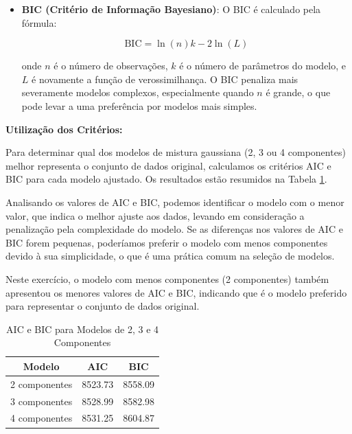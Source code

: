 \begin{enumerate}
\begin{tcolorbox}[colback=white, colframe=black, title=Resposta:]
\begin{itemize}
        \item \textbf{BIC (Critério de Informação Bayesiano)}: O BIC é calculado pela fórmula:
    
        \[
        \text{BIC} = \ln(n)k - 2\ln(L)
        \]
    
        onde \(n\) é o número de observações, \(k\) é o número de parâmetros do modelo, e \(L\) é novamente a função de verossimilhança. O BIC penaliza mais severamente modelos complexos, especialmente quando \(n\) é grande, o que pode levar a uma preferência por modelos mais simples.
    
    \end{itemize}
    
    \textbf{Utilização dos Critérios:} 
    
    Para determinar qual dos modelos de mistura gaussiana (2, 3 ou 4 componentes) melhor representa o conjunto de dados original, calculamos os critérios AIC e BIC para cada modelo ajustado. Os resultados estão resumidos na Tabela \ref{tab:aic_bic}.
    
    Analisando os valores de AIC e BIC, podemos identificar o modelo com o menor valor, que indica o melhor ajuste aos dados, levando em consideração a penalização pela complexidade do modelo. Se as diferenças nos valores de AIC e BIC forem pequenas, poderíamos preferir o modelo com menos componentes devido à sua simplicidade, o que é uma prática comum na seleção de modelos.

    Neste exercício, o modelo com menos componentes (2 componentes) também apresentou os menores valores de AIC e BIC, indicando que é o modelo preferido para representar o conjunto de dados original.
    
    \end{tcolorbox}
    
    \begin{table}[H]
        \centering
        \caption{AIC e BIC para Modelos de 2, 3 e 4 Componentes}
        \begin{tabular}{|c|c|c|}
            \hline
            \textbf{Modelo} & \textbf{AIC} & \textbf{BIC} \\
            \hline
            2 componentes & 8523.73 & 8558.09 \\
            \hline
            3 componentes & 8528.99 & 8582.98 \\
            \hline
            4 componentes & 8531.25 & 8604.87 \\
            \hline
        \end{tabular}
        \label{tab:aic_bic}
    \end{table}
    

\end{enumerate}
